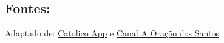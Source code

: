 \documentclass[a4paper,14pt]{extarticle} \usepackage[utf8]{inputenc}
\begin{document}
\vfill

\begin{center}
\subsection*{Fontes:}
Adaptado de: {\color{blue} \underline{\href{https://catolicoapp.com/santo/sao-joao-jose-da-cruz/}{Catolico App}}} e {\color{blue} \underline{\href{https://www.youtube.com/playlist?list=PLN7jQwkJvdQqUgkNY26QNpnL5zagNNgRU}{Canal A Oração dos Santos}}}
\end{center}
\end{document}
